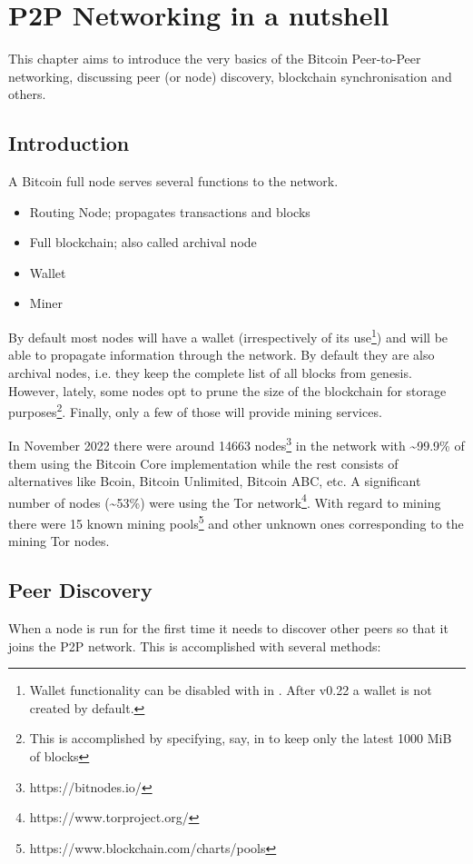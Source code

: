\chapter{P2P Networking in a nutshell}

\begin{summary}
This chapter aims to introduce the very basics of the Bitcoin Peer-to-Peer networking, discussing peer (or node) discovery, blockchain synchronisation and others. 
\end{summary}

\section{Introduction}
A Bitcoin full node serves several functions to the network.

\begin{itemize}
\item Routing Node; propagates transactions and blocks
\item Full blockchain; also called archival node
\item Wallet
\item Miner
\end{itemize}

By default most nodes will have a wallet (irrespectively of its use\footnote{Wallet functionality can be disabled with  in . After v0.22 a wallet is not created by default.}) and will be able to propagate information through the network. By default they are also archival nodes, i.e. they keep the complete list of all blocks from genesis. However, lately, some nodes opt to prune the size of the blockchain for storage purposes\footnote{This is accomplished by specifying, say,   in  to keep only the latest 1000 MiB of blocks}. Finally, only a few of those will provide mining services.

In November 2022 there were around 14663 nodes\footnote{https://bitnodes.io/} in the network with \textasciitilde 99.9\% of them using the Bitcoin Core implementation while the rest consists of alternatives like Bcoin, Bitcoin Unlimited, Bitcoin ABC, etc. A significant number of nodes (\textasciitilde 53\%) were using the Tor network\footnote{https://www.torproject.org/}. With regard to mining there were 15 known mining pools\footnote{https://www.blockchain.com/charts/pools} and other unknown ones corresponding to the mining Tor nodes.


\section{Peer Discovery}
When a node is run for the first time it needs to discover other peers so that it joins the P2P network. This is accomplished with several methods:

